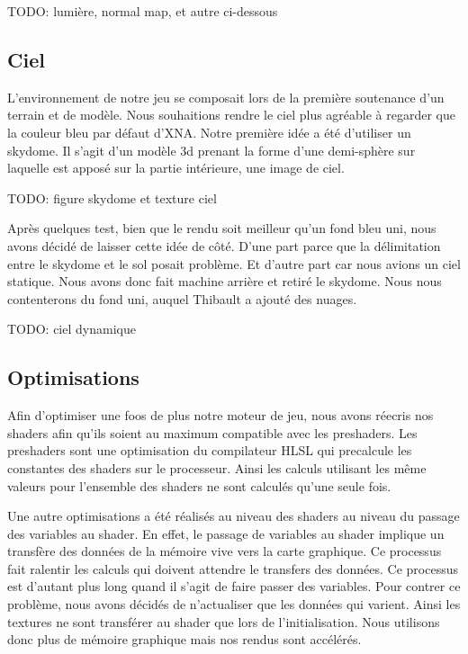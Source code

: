 \documentclass[11pt]{report}
\begin{document}
TODO: lumière, normal map, et autre ci-dessous

\subsection{Ciel}

L’environnement de notre jeu se composait lors de la première soutenance d’un terrain et de modèle. Nous souhaitions rendre le ciel plus agréable à regarder que la couleur bleu par défaut d’XNA. Notre première idée a été d’utiliser un skydome. Il s’agit d’un modèle 3d prenant la forme d’une demi-sphère sur laquelle est apposé sur la partie intérieure, une image de ciel.

TODO: figure skydome et texture ciel

Après quelques test, bien que le rendu soit meilleur qu’un fond bleu uni, nous avons décidé de laisser cette idée de côté.  D’une part parce que la délimitation entre le skydome et le sol posait problème. Et d’autre part car nous avions un ciel statique.
Nous avons donc fait machine arrière et retiré le skydome. Nous nous contenterons du fond uni, auquel Thibault a ajouté des nuages. 

TODO: ciel dynamique

\subsection{Optimisations}

Afin d’optimiser une foos de plus notre moteur de jeu, nous avons réecris nos shaders afin qu’ils soient au maximum compatible avec les preshaders. Les preshaders sont une optimisation du compilateur HLSL qui precalcule les constantes des shaders sur le processeur. Ainsi les calculs utilisant les même valeurs pour l’ensemble des shaders ne sont calculés qu’une seule fois.

Une autre optimisations a été réalisés au niveau des shaders au niveau du passage des variables au shader. En effet, le passage de variables au shader implique un transfère des données de la mémoire vive vers la carte graphique. Ce processus fait ralentir les calculs qui doivent attendre le transfers des données. Ce processus est d’autant plus long quand il s’agit de faire passer des variables. Pour contrer ce problème, nous avons décidés de n’actualiser que les données qui varient. Ainsi les textures ne sont transférer au shader que lors de l’initialisation. Nous utilisons donc plus de mémoire graphique mais nos rendus sont accélérés.
\end{document}
